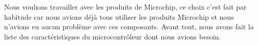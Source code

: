 \documentclass[11pt, french]{article} %
\begin{document}
%
%
%
%
%
%


Nous voulions travailler avec les produits de Microchip, ce choix c'est fait par habitude car nous avions déjà tous utiliser les produits Microchip et nous n'avions eu aucun problème avec ces composants. Avant tout, nous avons fait la liste des caractéristiques du microcontrôleur dont nous avions besoin.
\end{document}

